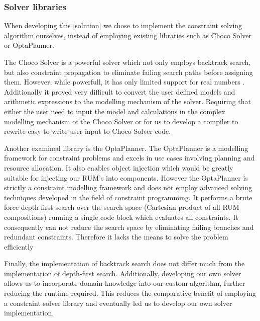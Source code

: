 
\subsubsection{Solver libraries}
When developing this [solution] we chose to implement the constraint solving algorithm ourselves, instead of employing existing libraries such as Choco Solver\cite{web:choco} or OptaPlanner\cite{web:opta}. 

The Choco Solver is a powerful solver which not only employs backtrack search, but also constraint propagation to eliminate failing search paths before assigning them. However, while powerfull, it has only limited support for real numbers \cite{ibex-choco}. Additionally it proved very difficult to convert the user defined models and arithmetic expressions to the modelling mechanism of the solver. Requiring that either the user need to input the model and calculations in the complex modelling mechanism of the Choco Solver or for us to develop a compiler to rewrite easy to write user input to Choco Solver code.

Another examined library is the OptaPlanner. The OptaPlanner is a modelling framework for constraint problems and excels in use cases involving planning and resource allocation. It also enables object injection which would be greatly suitable for injecting our RUM's into components. However the OptaPlanner is strictly a constraint modelling framework and does not employ advanced solving techniques developed in the field of constraint programming. It performs a brute force depth-first search over the search space (Cartesian product of all RUM compositions) running a single code block which evaluates all constraints. It consequently can not reduce the search space by eliminating failing branches and redundant constraints. Therefore it lacks the means to solve the problem efficiently

Finally, the implementation of backtrack search does not differ much from the implementation of depth-first search. Additionally, developing our own solver allows us to incorporate domain knowledge into our custom algorithm, further reducing the runtime required. This reduces the comparative benefit of employing a constraint solver library and eventually led us to develop our own solver implementation.

